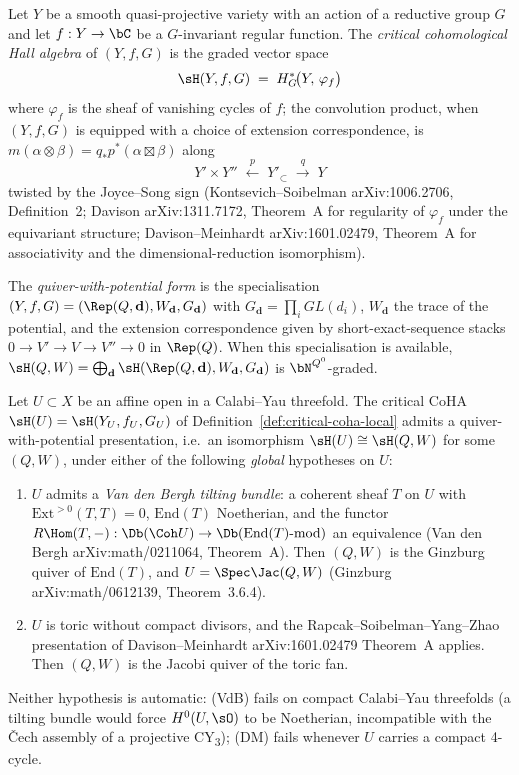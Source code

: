 \begin{definition}
\label{def:critical-coha-local}
Let $Y$ be a smooth quasi-projective variety with an action of a
reductive group $G$ and let $f: Y \to \bC$ be a $G$-invariant
regular function. The \emph{critical cohomological Hall algebra}
of $(Y, f, G)$ is the graded vector space
\[
 \sH(Y, f, G) \;=\; H^{*}_{G}\!\bigl(Y,\, \varphi_f\bigr)
\]
where $\varphi_f$ is the sheaf of vanishing cycles of $f$; the
convolution product, when $(Y, f, G)$ is equipped with a choice of
extension correspondence, is
$m(\alpha \otimes \beta) = q_* p^*(\alpha \boxtimes \beta)$ along
\[
 Y' \times Y''
 \;\xleftarrow{p}\;
 Y'_{\subset}
 \;\xrightarrow{q}\;
 Y
\]
twisted by the Joyce--Song sign
(Kontsevich--Soibelman arXiv:1006.2706, Definition~2; Davison
arXiv:1311.7172, Theorem~A for regularity of $\varphi_f$ under the
equivariant structure; Davison--Meinhardt arXiv:1601.02479,
Theorem~A for associativity and the dimensional-reduction
isomorphism).

The \emph{quiver-with-potential form} is the specialisation
$(Y, f, G) = (\Rep(Q, \mathbf d), W_{\mathbf d}, G_{\mathbf d})$
with $G_{\mathbf d} = \prod_i GL(d_i)$, $W_{\mathbf d}$ the trace
of the potential, and the extension correspondence given by
short-exact-sequence stacks $0 \to V' \to V \to V'' \to 0$ in
$\Rep(Q)$. When this specialisation is available, $\sH(Q, W) =
\bigoplus_{\mathbf d} \sH(\Rep(Q, \mathbf d), W_{\mathbf d}, G_{\mathbf d})$
is $\bN^{Q^0}$-graded.
\end{definition}

\begin{proposition}
\label{prop:chart-quiver-presentation}
Let $U \subset X$ be an affine open in a Calabi--Yau threefold.
The critical CoHA $\sH(U) = \sH(Y_U, f_U, G_U)$ of
Definition~\ref{def:critical-coha-local} admits a
quiver-with-potential presentation, i.e.\ an isomorphism $\sH(U)
\cong \sH(Q, W)$ for some $(Q, W)$, under either of the following
\emph{global} hypotheses on $U$:
\begin{enumerate}
\item[(VdB)] $U$ admits a \emph{Van den Bergh tilting bundle}: a
 coherent sheaf $T$ on $U$ with $\mathrm{Ext}^{>0}(T, T) = 0$,
 $\mathrm{End}(T)$ Noetherian, and the functor
 $R\Hom(T, -): \Db(\Coh U) \to \Db(\mathrm{End}(T)\text{-mod})$ an
 equivalence (Van den Bergh arXiv:math/0211064, Theorem~A). Then
 $(Q, W)$ is the Ginzburg quiver of $\mathrm{End}(T)$, and
 $U = \Spec \Jac(Q, W)$ (Ginzburg arXiv:math/0612139,
 Theorem~3.6.4).
\item[(DM)] $U$ is toric without compact divisors, and the
 Rapcak--Soibelman--Yang--Zhao presentation of
 Davison--Meinhardt arXiv:1601.02479 Theorem~A applies. Then
 $(Q, W)$ is the Jacobi quiver of the toric fan.
\end{enumerate}
Neither hypothesis is automatic: (VdB) fails on compact
Calabi--Yau threefolds (a tilting bundle would force $H^0(U, \sO)$
to be Noetherian, incompatible with the Čech assembly of a
projective CY\textsubscript{3}); (DM) fails whenever $U$ carries
a compact 4-cycle.
\end{proposition}

